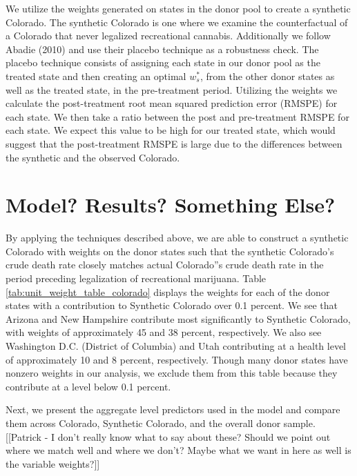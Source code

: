 \documentclass{article}
\begin{document}
We utilize the weights generated on states in the donor pool to create a synthetic Colorado. The synthetic Colorado is one where we examine the counterfactual of a Colorado that never legalized recreational cannabis. Additionally we follow Abadie (2010) and use their placebo technique as a robustness check. The placebo technique consists of assigning each state in our donor pool as the treated state and then creating an optimal $w^{*}_s$, from the other donor states as well as the treated state, in the pre-treatment period. Utilizing the weights we calculate the post-treatment root mean squared prediction error (RMSPE) for each state. We then take a ratio between the post and pre-treatment RMSPE for each state. We expect this value to be high for our treated state, which would suggest that the post-treatment RMSPE is large due to the differences between the synthetic and the observed Colorado.


\section{Model? Results? Something Else?}

By applying the techniques described above, we are able to construct a synthetic Colorado with weights on the donor states such that the synthetic Colorado's crude death rate closely matches actual Colorado''s crude death rate in the period preceding legalization of recreational marijuana. Table \ref{tab:unit_weight_table_colorado} displays the weights for each of the donor states with a contribution to Synthetic Colorado over 0.1 percent. We see that Arizona and New Hampshire contribute most significantly to Synthetic Colorado, with weights of approximately 45 and 38 percent, respectively. We also see Washington D.C. (District of Columbia) and Utah contributing at a health level of approximately 10 and 8 percent, respectively. Though many donor states have nonzero weights in our analysis, we exclude them from this table because they contribute at a level below 0.1 percent.



Next, we present the aggregate level predictors used in the model and compare them across Colorado, Synthetic Colorado, and the overall donor sample. [[Patrick - I don't really know what to say about these? Should we point out where we match well and where we don't? Maybe what we want in here as well is the variable weights?]]


\end{document}
